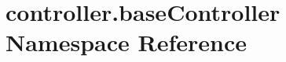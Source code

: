 \hypertarget{namespacecontroller_1_1baseController}{}\section{controller.\+base\+Controller Namespace Reference}
\label{namespacecontroller_1_1baseController}
